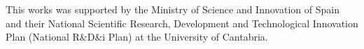 \documentclass[conference]{IEEEtran}
\begin{document}
This works was supported by the Ministry of Science and Innovation of Spain and
their National Scientific Research, Development and Technological Innovation
Plan (National R\&D\&i Plan) at the University of Cantabria.



















{}

\end{document}

